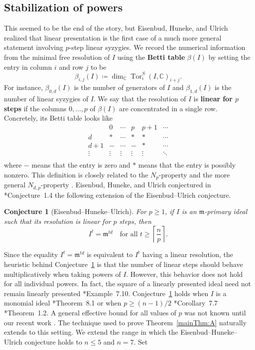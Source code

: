 \documentclass[11pt,letterpaper,reqno]{amsart}
\newcommand{\CC}{\mathbb{C}}
\newcommand{\m}{\mathfrak{m}}
\newcommand{\Tor}{\operatorname{Tor}}
\newtheorem{conjecture}[theorem]{Conjecture}
\theoremstyle{definition}
\numberwithin{equation}{section}
\begin{document}
\subsection*{Stabilization of powers}
This seemed to be the end of the story, but Eisenbud, Huneke, and Ulrich realized that linear presentation is the first case of a much more general statement involving $p$-step linear syzygies. We record the numerical information from the minimal free resolution of $I$ using the \textbf{Betti table} $\beta(I)$ by setting the entry in column $i$ and row $j$ to be
\[\beta_{i,j}(I) \coloneqq \dim_\CC \Tor_i^S(I,\CC)_{i+j}.\]
For instance, $\beta_{0,d}(I)$ is the number of generators of $I$ and $\beta_{1,d}(I)$ is the number of linear syzygies of $I$. We say that the resolution of $I$ is \textbf{linear for $p$ steps} if the columns $0,\dots,p$ of $\beta(I)$ are concentrated in a single row. Concretely, its Betti table looks like
\[\begin{array}{c|cccccccccc}
     & 0 & \cdots & p & p+1 &\cdots \\\hline
    d & \ast & \cdots & \ast & \ast & \cdots\\
    d+1 & - & \cdots & - &\ast & \cdots\\
    \vdots &\vdots&\vdots&\vdots&\vdots&\ddots\\
\end{array}\]
where $-$ means that the entry is zero and $\ast$ means that the entry is possibly nonzero. This definition is closely related to the $N_p$-property \cite{GL} and the more general $N_{d,p}$-property \cite{EGHP}. Eisenbud, Huneke, and Ulrich conjectured in \cite{EHU}*{Conjecture~1.4} the following extension of the Eisenbud--Ulrich conjecture.
\begin{conjecture}[Eisenbud--Huneke--Ulrich]\label{conj:EHU}
    For $p \ge 1$, if $I$ is an $\m$-primary ideal such that its resolution is linear for $p$ steps, then
    \[I^t = \m^{td} \quad \text{for all }t \ge \left\lceil \frac{n}{p}\right\rceil.\]
\end{conjecture}
\noindent
Since the equality $I^t = \m^{td}$ is equivalent to $I^t$ having a linear resolution, the heuristic behind Conjecture~\ref{conj:EHU} is that the number of linear steps should behave multiplicatively when taking powers of $I$. However, this behavior does not hold for all individual powers. In fact, the square of a linearly presented ideal need not remain linearly presented \cite{EHU}*{Example~7.10}. Conjecture~\ref{conj:EHU} holds when $I$ is a monomial ideal \cite{EHU}*{Theorem~8.1} or when $p \ge (n-1)/2$ \cite{EHU}*{Corollary~7.7} \cite{yang}*{Theorem~1.2}. A general effective bound for all values of $p$ was not known until our recent work \cite{yang}. The technique used to prove Theorem~\ref{mainThm:A} naturally extends to this setting. We extend the range in which the Eisenbud--Huneke--Ulrich conjecture holds to $n\le 5$ and $n = 7$. Set 
\end{document}
